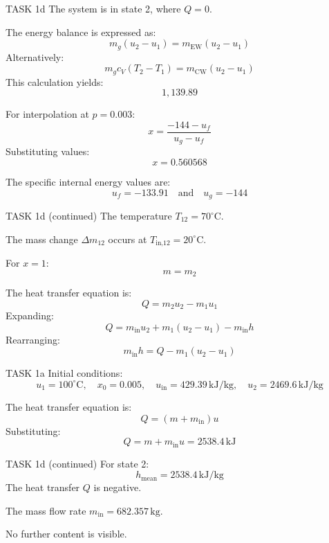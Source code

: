 TASK 1d  
The system is in state 2, where \( Q = 0 \).  

The energy balance is expressed as:  
\[
m_g (u_2 - u_1) = m_{\text{EW}} (u_2 - u_1)
\]  
Alternatively:  
\[
m_g c_V (T_2 - T_1) = m_{\text{CW}} (u_2 - u_1)
\]  
This calculation yields:  
\[
1,139.89
\]  

For interpolation at \( p = 0.003 \):  
\[
x = \frac{-144 - u_f}{u_g - u_f}
\]  
Substituting values:  
\[
x = 0.560568
\]  

The specific internal energy values are:  
\[
u_f = -133.91 \quad \text{and} \quad u_g = -144
\]  

TASK 1d (continued)  
The temperature \( T_{12} = 70^\circ\text{C} \).  

The mass change \( \Delta m_{12} \) occurs at \( T_{\text{in,12}} = 20^\circ\text{C} \).  

For \( x = 1 \):  
\[
m = m_2
\]  

The heat transfer equation is:  
\[
Q = m_2 u_2 - m_1 u_1
\]  
Expanding:  
\[
Q = m_{\text{in}} u_2 + m_1 (u_2 - u_1) - m_{\text{in}} h
\]  
Rearranging:  
\[
m_{\text{in}} h = Q - m_1 (u_2 - u_1)
\]  

TASK 1a  
Initial conditions:  
\[
u_1 = 100^\circ\text{C}, \quad x_0 = 0.005, \quad u_{\text{in}} = 429.39 \, \text{kJ/kg}, \quad u_2 = 2469.6 \, \text{kJ/kg}
\]  

The heat transfer equation is:  
\[
Q = (m + m_{\text{in}}) u
\]  
Substituting:  
\[
Q = m + m_{\text{in}} u = 2538.4 \, \text{kJ}
\]  

TASK 1d (continued)  
For state 2:  
\[
h_{\text{mean}} = 2538.4 \, \text{kJ/kg}
\]  
The heat transfer \( Q \) is negative.  

The mass flow rate \( m_{\text{in}} = 682.357 \, \text{kg} \).  

No further content is visible.